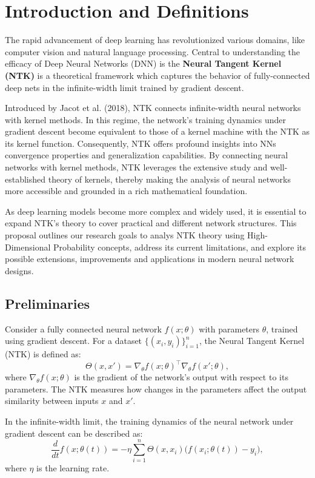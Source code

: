 \section{Introduction and Definitions}\label{sec:introduction}
The rapid advancement of deep learning has revolutionized various domains, like computer vision and natural language processing. Central to understanding the efficacy of Deep Neural Networks (DNN) is the \textbf{Neural Tangent Kernel (NTK)} is a theoretical framework which captures the behavior of fully-connected
deep nets in the infinite-width limit trained by gradient descent.~\cite{jacot2018neural}

Introduced by Jacot et al. (2018), NTK connects infinite-width neural networks with kernel methods. In this regime, the network's training dynamics under gradient descent become equivalent to those of a kernel machine with the NTK as its kernel function. Consequently, NTK offers profound insights into NNs convergence properties and generalization capabilities. By connecting neural networks with kernel methods, NTK leverages the extensive study and well-established theory of kernels, thereby making the analysis of neural networks more accessible and grounded in a rich mathematical foundation.

As deep learning models become more complex and widely used, it is essential to expand NTK's theory to cover practical and different network structures. This proposal outlines our research goals to analys NTK theory using High-Dimensional Probability concepts, address its current limitations, and explore its possible extensions, improvements and applications in modern neural network designs.


\subsection{Preliminaries}
Consider a fully connected neural network \( f(x; \theta) \) with parameters \( \theta \), trained using gradient descent. For a dataset \(\{(x_i, y_i)\}_{i=1}^n\), the Neural Tangent Kernel (NTK) is defined as:  
\[
\Theta(x, x') = \nabla_\theta f(x; \theta)^\top \nabla_\theta f(x'; \theta),
\]
where \( \nabla_\theta f(x; \theta) \) is the gradient of the network's output with respect to its parameters.
The NTK measures how changes in the parameters affect the output similarity between inputs \(x\) and \(x'\).


In the infinite-width limit, the training dynamics of the neural network under gradient descent can be described as:
\[
\frac{d}{dt} f(x; \theta(t)) = -\eta \sum_{i=1}^n \Theta(x, x_i) \big(f(x_i; \theta(t)) - y_i\big),
\]
where \(\eta\) is the learning rate.

